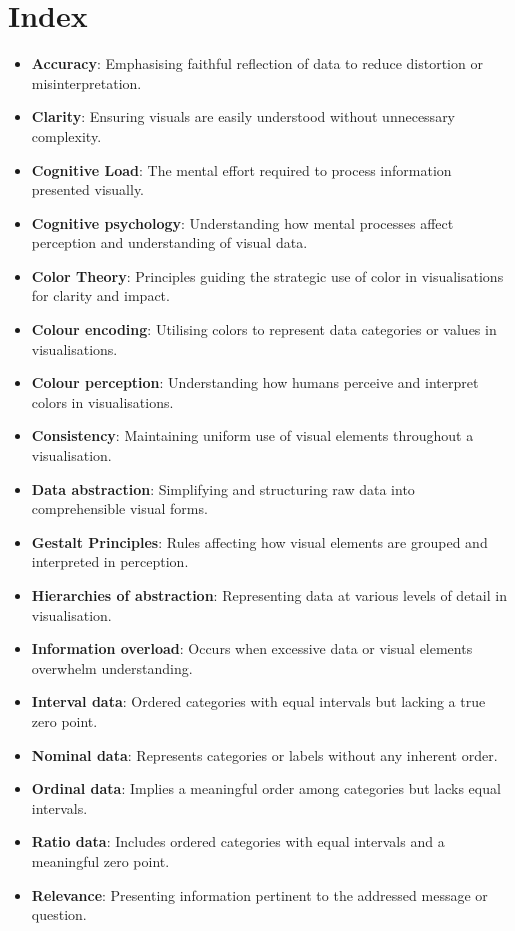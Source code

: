 \documentclass{article}\usepackage[]{graphicx}\usepackage[]{xcolor}
\numberwithin{equation}{section}
\begin{document}
{\newpage  

\section{Index}  

\begin{itemize}
    \item \textbf{Accuracy}: Emphasising faithful reflection of data to reduce distortion or misinterpretation.
    \item \textbf{Clarity}: Ensuring visuals are easily understood without unnecessary complexity.
    \item \textbf{Cognitive Load}: The mental effort required to process information presented visually.
    \item \textbf{Cognitive psychology}: Understanding how mental processes affect perception and understanding of visual data.
    \item \textbf{Color Theory}: Principles guiding the strategic use of color in visualisations for clarity and impact.
    \item \textbf{Colour encoding}: Utilising colors to represent data categories or values in visualisations.
    \item \textbf{Colour perception}: Understanding how humans perceive and interpret colors in visualisations.
    \item \textbf{Consistency}: Maintaining uniform use of visual elements throughout a visualisation.
    \item \textbf{Data abstraction}: Simplifying and structuring raw data into comprehensible visual forms.
    \item \textbf{Gestalt Principles}: Rules affecting how visual elements are grouped and interpreted in perception.
    \item \textbf{Hierarchies of abstraction}: Representing data at various levels of detail in visualisation.
    \item \textbf{Information overload}: Occurs when excessive data or visual elements overwhelm understanding.
    \item \textbf{Interval data}: Ordered categories with equal intervals but lacking a true zero point.
    \item \textbf{Nominal data}: Represents categories or labels without any inherent order.
    \item \textbf{Ordinal data}: Implies a meaningful order among categories but lacks equal intervals.
    \item \textbf{Ratio data}: Includes ordered categories with equal intervals and a meaningful zero point.
    \item \textbf{Relevance}: Presenting information pertinent to the addressed message or question.
\end{itemize}
  
}
\end{document}
